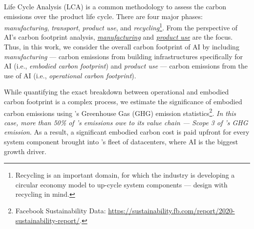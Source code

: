 Life Cycle Analysis (LCA) is a common methodology to assess the carbon emissions over the product life cycle. There are four major phases: \textit{manufacturing}, \textit{transport}, \textit{product use}, and \textit{recycling}\footnote{Recycling is an important domain, for which the industry is developing a circular economy model to up-cycle system components --- design with recycling in mind.}. From the perspective of AI's carbon footprint analysis, \textit{\underline{manufacturing}} and \textit{\underline{product use}} are the focus. Thus, in this work, we consider the overall carbon footprint of AI by including \textit{manufacturing} --- carbon emissions from building %
infrastructures specifically for AI (i.e., \textit{embodied carbon footprint}) and \textit{product use} --- carbon emissions from the use of AI (i.e., \textit{operational carbon footprint}).

While quantifying the exact breakdown between operational and embodied carbon footprint is a complex process, we estimate the significance of embodied carbon emissions using \fb’s Greenhouse Gas (GHG) emission statistics\footnote{Facebook  Sustainability Data: \url{https://sustainability.fb.com/report/2020-sustainability-report/}.}. 
\textit{In this case, more than 50\% of \fb’s emissions owe to its value chain --- Scope 3 of \fb's GHG emission}. As a result, a significant embodied carbon cost is paid upfront for every system component brought into \fb's fleet of datacenters, where AI is the biggest growth driver.
